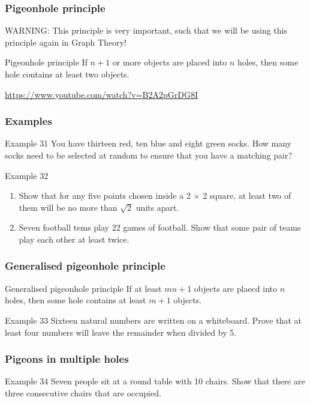 \documentclass[
	11pt, %
]{beamer}
\begin{document}
\begin{frame}
    \frametitle{Pigeonhole principle}
    \alert{WARNING}: This principle is very important, such that we will be using this principle again in Graph Theory!
    \begin{block}{Pigeonhole principle}
        If $n+1$ or more objects are placed into $n$ holes, then some hole contains at least two objects.
    \end{block}

    \url{https://www.youtube.com/watch?v=B2A2pGrDG8I}
\end{frame}

\begin{frame}[t]
    \frametitle{Examples}
    \begin{block}{Example 31}
        You have thirteen red, ten blue and eight green socks. How many socks need to be selected at random to ensure that 
        you have a matching pair?
    \end{block}
    \begin{block}{Example 32}
        \begin{enumerate}
            \item Show that for any five points chosen inside a 2 $\times$ 2 square, at least two of them will be no more than 
            $\sqrt{2}$ units apart.
            \item Seven football tems play 22 games of football. Show that some pair of teams play each other at least twice.
        \end{enumerate}
    \end{block}
\end{frame}

\begin{frame}[t]
    \frametitle{Generalised pigeonhole principle}
    \begin{block}{Generalised pigeonhole principle}
        If at least $mn + 1$ objects are plaecd into $n$ holes, then some hole contains at least $m+1$ objects.
    \end{block}
    \begin{block}{Example 33}
        Sixteen natural numbers are written on a whiteboard. Prove that at least four numbers will leave the remainder when divided by 5.
    \end{block}
\end{frame}

\begin{frame}[t]
    \frametitle{Pigeons in multiple holes}
    \begin{block}{Example 34}
        Seven people sit at a round table with 10 chairs. Show that there are three consecutive chairs that are occupied.
    \end{block}
\end{frame}
\end{document}

